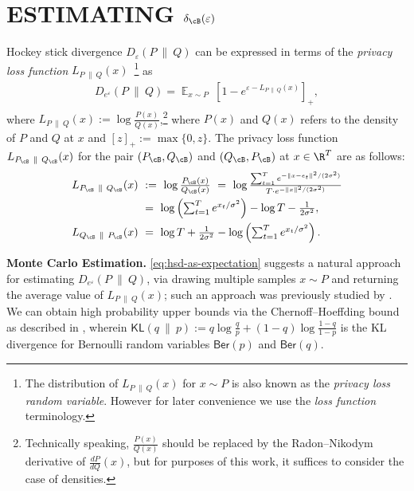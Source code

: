 \documentclass[twoside]{article}
\theoremstyle{definition}
\DeclareMathOperator*{\Ex}{\mathbb{E}}
\newcommand{\eps}{\varepsilon}
\newcommand{\prn}[1]{\left ( #1 \right )}
\newcommand{\Deps}{D_{e^{\eps}}}
\newcommand{\KL}{\mathsf{KL}}
\newcommand{\deltaB}{\delta_{\cB}}
\newcommand{\PB}{P_{\cB}}
\newcommand{\QB}{Q_{\cB}}
\newcommand{\Ber}{\mathsf{Ber}}
\begin{document}
\section{\boldmath ESTIMATING \texorpdfstring{$\deltaB(\eps)$}{deltaB(eps)}}\label{sec:Monte Carlo}
\vspace{-2mm}

Hockey stick divergence $D_{\eps}(P ~\|~ Q)$ can be expressed in terms of the {\em privacy loss function} $L_{P ~\|~ Q}(x)$~\citep{dwork16concentrated}\footnote{The distribution of $L_{P ~\|~ Q}(x)$ for $x \sim P$ is also known as the {\em privacy loss random variable}. However for later convenience we use the {\em loss function} terminology.} as
\begin{align}\textstyle
    \Deps(P ~\|~ Q) = \Ex_{x \sim P}~[1 - e^{\eps - L_{P ~\|~ Q}(x)}]_+,\label{eq:hsd-as-expectation}
\end{align}
where $L_{P ~\|~ Q}(x) := \log \frac{P(x)}{Q(x)}$,\footnote{Technically speaking, $\frac{P(x)}{Q(x)}$ should be replaced by the Radon--Nikodym derivative of $\frac{dP}{dQ}(x)$, but for purposes of this work, it suffices to consider the case of densities.} where $P(x)$ and $Q(x)$ refers to the density of $P$ and $Q$ at $x$ and $[z]_+ := \max\{0, z\}$. The privacy loss function $L_{\PB ~\|~ \QB}(x)$ for the pair $(\PB, \QB)$ and $(\QB, \PB)$ at $x \in \R^T$ are as follows:
\begin{align}
L_{\PB ~\|~ \QB}(x) &\textstyle~:=~ \log \frac{\PB(x)}{\QB(x)}
~=~ \log \frac{\sum_{t=1}^T e^{-\| x - e_t\|^2 / (2\sigma^2)}}{T \cdot e^{-\|x\|^2 / (2\sigma^2)}} \nonumber\\
&\textstyle~=~ \log \prn{\sum_{t=1}^T e^{x_t / \sigma^2}} - \log T - \frac{1}{2\sigma^2},\label{eq:loss_pb_qb}\\
L_{\QB ~\|~ \PB}(x)
&\textstyle~=~ \log T + \frac{1}{2\sigma^2} - \log \prn{\sum_{t=1}^T e^{x_t / \sigma^2}}.\label{eq:loss_qb_pb} 
\end{align}

{\bf Monte Carlo Estimation.} \eqref{eq:hsd-as-expectation} suggests a natural approach for estimating $\Deps(P ~\|~ Q)$, via drawing multiple samples $x \sim P$ and returning the average value of $L_{P ~\|~ Q}(x)$; such an approach was previously studied by \cite{wang23randomized}. We can obtain high probability upper bounds via the Chernoff--Hoeffding bound as described in , wherein $\KL(q ~\|~ p) := q \log \frac{q}{p} + (1 - q) \log \frac{1-q}{1-p}$ is the KL divergence for Bernoulli random variables $\Ber(p)$ and $\Ber(q)$.
\end{document}
